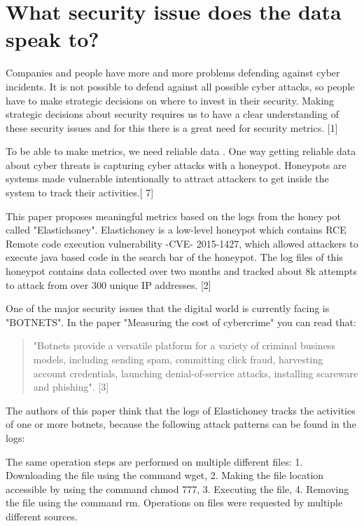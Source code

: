 \documentclass[a4paper]{article}
\author{}
\begin{document}
	
\section{What security issue does the data speak to?}

Companies and people have more and more problems defending against cyber incidents. It is not possible to defend against all possible cyber attacks, so people have to make strategic decisions on where to invest in their security. Making strategic decisions about security requires us to have a clear understanding of these security issues and for this there is a great need for security metrics. [1]

To be able to make metrics, we need reliable data . One way getting reliable data about cyber threats is capturing cyber attacks with a honeypot. Honeypots are systems made vulnerable intentionally to attract attackers to get inside the system to track their activities.[ 7]

This paper proposes meaningful metrics based on the logs from the honey pot called "Elastichoney". Elastichoney is a low-level honeypot which contains RCE Remote code execution vulnerability -CVE- 2015-1427, which allowed attackers to execute java based code in the search bar of the honeypot. The log files of this honeypot contains data collected over two months and tracked about 8k attempts to attack from over 300 unique IP addresses. [2]

One of the major security issues that the digital world is currently facing is "BOTNETS". In the paper "Measuring the cost of cybercrime" you can read that:

\begin{quote}
	"Botnets provide a versatile platform for a variety of criminal business models, including sending spam, committing click fraud, harvesting account credentials, launching denial-of-service attacks, installing scareware and phishing". [3]
\end{quote}

The authors of this paper think that the logs of Elastichoney tracks the activities of one or more botnets, because the following attack patterns can be found in the logs:

The same operation steps are performed on multiple different files:
1. Downloading the file using the command wget,
2. Making the file location accessible by using the command chmod 777,
3. Executing the file,
4. Removing the file using the command rm.
Operations on files were requested by multiple different sources.
\end{document}
